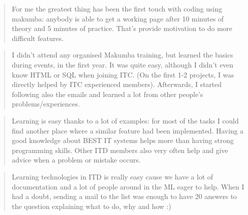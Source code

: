 \documentclass{acm_proc_article-sp}
\begin{document}

\begin{quotation}
	For me the greatest thing has been the first touch with coding using makumba: anybody is able to get a working page after 10 minutes of theory and 5 minutes of practice. That's provide motivation to do more difficult features.
\end{quotation}

\begin{quotation}
	I didn't attend any organised Makumba training, but learned the basics during events, in the first year. It was quite easy, although I didn't even know HTML or SQL when joining ITC. 
	(On the first 1-2 projects, I was directly helped by ITC experienced members). Afterwards, I started following also the emails and learned a lot from other people's problems/experiences.	
\end{quotation}


\begin{quotation}
	Learning is easy thanks to a lot of examples: for most of the tasks I could find another place where a similar feature had been implemented. Having a good knowledge about BEST IT systems helps more than having strong programming skills. Other ITD members also very often help and give advice when a problem or mistake occurs. 
\end{quotation}

\begin{quotation}
	Learning technologies in ITD is really easy cause we have a lot of documentation and a lot of people around in the ML eager to help. When I had a doubt, sending a mail to the list was enough to have 20 answers to the question explaining what to do, why and how :) 
\end{quotation}
\end{document}
